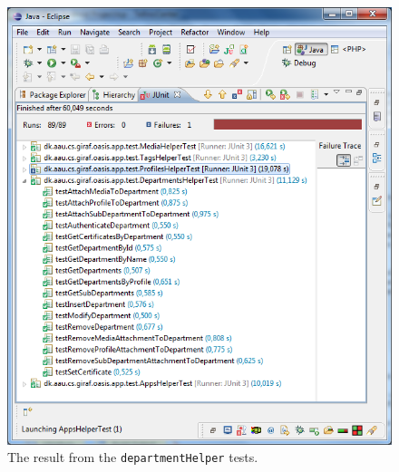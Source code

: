 \begin{figure}[htbp]
	\centering
		\includegraphics[width=\textwidth]{Images/unit_testing/department_helper_tests.PNG}
	\caption{The result from the \texttt{departmentHelper} tests.}
	\label{fig:department_helper_tests}
\end{figure}

